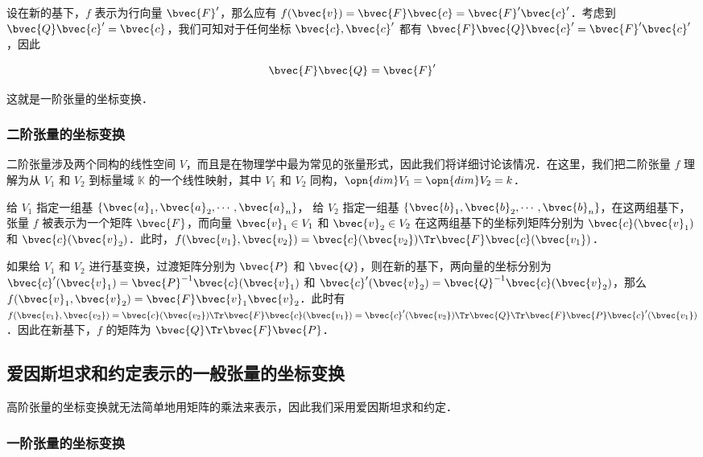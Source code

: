 设在新的基下，$f$ 表示为行向量 $\bvec{F}'$，那么应有 $f(\bvec{v})=\bvec{F}\bvec{c}=\bvec{F}'\bvec{c}'$．考虑到 $\bvec{Q}\bvec{c}'=\bvec{c}$，我们可知对于任何坐标 $\bvec{c}, \bvec{c}'$ 都有 $\bvec{F}\bvec{Q}\bvec{c}'=\bvec{F}'\bvec{c}'$，因此

\begin{equation}
\bvec{F}\bvec{Q}=\bvec{F}'
\end{equation}

这就是一阶张量的坐标变换．
\subsubsection{二阶张量的坐标变换}

二阶张量涉及两个同构的线性空间 $V$，而且是在物理学中最为常见的张量形式，因此我们将详细讨论该情况．在这里，我们把二阶张量 $f$ 理解为从 $V_1$ 和 $V_2$ 到标量域 $\mathbb{K}$ 的一个线性映射，其中 $V_1$ 和 $V_2$ 同构，$\opn{dim}V_1=\opn{dim}V_2=k$．

给 $V_1$ 指定一组基 $\{\bvec{a}_1, \bvec{a}_2, \cdots, \bvec{a}_n\}$， 给 $V_2$ 指定一组基 $\{\bvec{b}_1, \bvec{b}_2, \cdots, \bvec{b}_n\}$，在这两组基下，张量 $f$ 被表示为一个矩阵 $\bvec{F}$，而向量 $\bvec{v}_1\in V_1$ 和 $\bvec{v}_2\in V_2$ 在这两组基下的坐标列矩阵分别为 $\bvec{c}(\bvec{v}_1)$ 和 $\bvec{c}(\bvec{v}_2)$．此时，$f(\bvec{v_1},\bvec{v_2})=\bvec{c}(\bvec{v_2})\Tr\bvec{F}\bvec{c}(\bvec{v_1})$．

如果给 $V_1$ 和 $V_2$ 进行基变换，过渡矩阵分别为 $\bvec{P}$ 和 $\bvec{Q}$，则在新的基下，两向量的坐标分别为 $\bvec{c}'(\bvec{v}_1)=\bvec{P}^{-1}\bvec{c}(\bvec{v}_1)$ 和 $\bvec{c}'(\bvec{v}_2)=\bvec{Q}^{-1}\bvec{c}(\bvec{v}_2)$，那么 $f(\bvec{v}_1, \bvec{v}_2)=\bvec{F}\bvec{v}_1\bvec{v}_2$．此时有 $f(\bvec{v_1},\bvec{v_2})=\bvec{c}(\bvec{v_2})\Tr\bvec{F}\bvec{c}(\bvec{v_1})=\bvec{c}'(\bvec{v_2})\Tr\bvec{Q}\Tr\bvec{F}\bvec{P}\bvec{c}'(\bvec{v_1})$．因此在新基下，$f$ 的矩阵为 $\bvec{Q}\Tr\bvec{F}\bvec{P}$．



\subsection{爱因斯坦求和约定表示的一般张量的坐标变换}

高阶张量的坐标变换就无法简单地用矩阵的乘法来表示，因此我们采用爱因斯坦求和约定．

\subsubsection{一阶张量的坐标变换}

